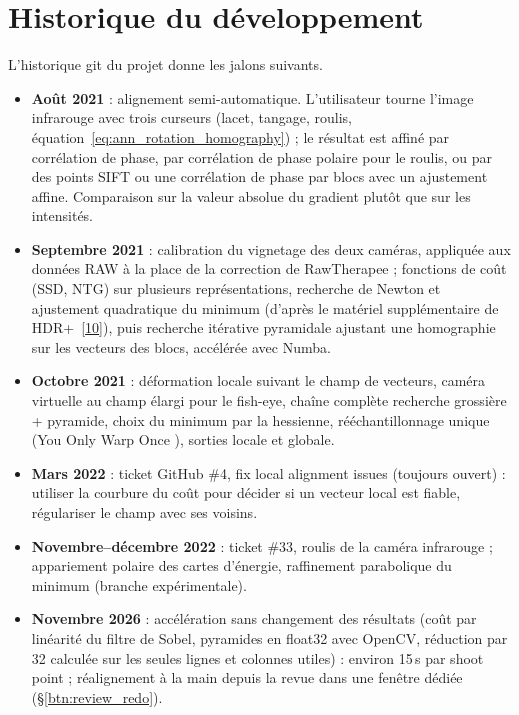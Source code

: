 \documentclass[a4paper,11pt]{report}
\begin{document}
\section{Historique du développement}\label{sec:ann_history}
L'historique git du projet donne les jalons suivants.
\begin{itemize}
	\item \textbf{Août 2021} : alignement semi-automatique. L'utilisateur tourne l'image infrarouge avec trois curseurs (lacet, tangage, roulis, équation~\eqref{eq:ann_rotation_homography}) ; le résultat est affiné par corrélation de phase, par corrélation de phase polaire pour le roulis, ou par des points SIFT ou une corrélation de phase par blocs avec un ajustement affine. Comparaison sur la valeur absolue du gradient plutôt que sur les intensités.
	\item \textbf{Septembre 2021} : calibration du vignetage des deux caméras, appliquée aux données RAW à la place de la correction de RawTherapee ; fonctions de coût (SSD, NTG) sur plusieurs représentations, recherche de Newton et ajustement quadratique du minimum (d'après le matériel supplémentaire de HDR+~[\hyperref[ann_hasinoff]{10}]), puis recherche itérative pyramidale ajustant une homographie sur les vecteurs des blocs, accélérée avec Numba.
	\item \textbf{Octobre 2021} : déformation locale suivant le champ de vecteurs, caméra virtuelle au champ élargi pour le fish-eye, chaîne complète recherche grossière + pyramide, choix du minimum par la hessienne, rééchantillonnage unique (\og You Only Warp Once \fg), sorties locale et globale.
	\item \textbf{Mars 2022} : ticket GitHub \#4, \og fix local alignment issues \fg{} (toujours ouvert) : utiliser la courbure du coût pour décider si un vecteur local est fiable, régulariser le champ avec ses voisins.
	\item \textbf{Novembre--décembre 2022} : ticket \#33, roulis de la caméra infrarouge ; appariement polaire des cartes d'énergie, raffinement parabolique du minimum (branche expérimentale).
	\item \textbf{Novembre 2026} : accélération sans changement des résultats (coût par linéarité du filtre de Sobel, pyramides en float32 avec OpenCV, réduction par 32 calculée sur les seules lignes et colonnes utiles) : environ 15\,s par shoot point ; réalignement à la main depuis la revue dans une fenêtre dédiée (§\ref{btn:review_redo}).
\end{itemize}
\end{document}
